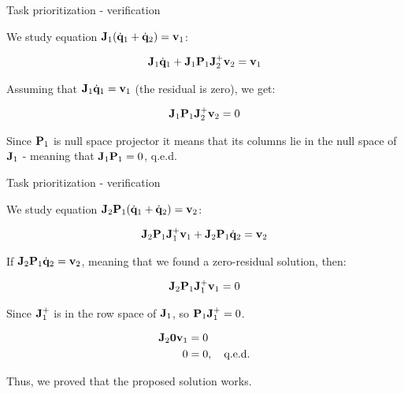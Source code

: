 \documentclass{beamer}
\newcommand{\dq} {\dot{\mathbf{q}}}
\begin{document}
\begin{frame}{Task prioritization - verification}
	\begin{flushleft}
		
	 We study equation $\bo{J}_1 (\dq_1 + \dq_2) =\bo{v}_1$:
	 
	 	\begin{align}
	 		 \bo{J}_1\dq_1 + 
	 		 \bo{J}_1\bo{P}_1 \bo{J}_2^+ \bo{v}_2 =
	 		 \bo{v}_1
	 	\end{align}	
 	
 	Assuming that $\bo{J}_1\dq_1 = \bo{v}_1$ (the residual is zero), we get:
 	
	 	\begin{align}
	\mathbf{J}_1\mathbf{P}_1 \mathbf{J}_2^+ \mathbf{v}_2 = 0
		\end{align}	 	
		
		Since $\mathbf{P}_1$ is null space projector it means that its columns lie in the null space of $\mathbf{J}_1$ - meaning that $\mathbf{J}_1\mathbf{P}_1 = 0$, q.e.d.
		
	\end{flushleft}
\end{frame}


\begin{frame}{Task prioritization - verification}
	\begin{flushleft}
		
		We study equation $\bo{J}_2 \bo{P}_1 (\dq_1 + \dq_2) =\bo{v}_2$:
		
		\begin{align}
			\bo{J}_2 \bo{P}_1 \bo{J}_1^+ \bo{v}_1 + 
			\bo{J}_2 \bo{P}_1 \dq_2 =
			\bo{v}_2
		\end{align}	
	
%		
		
		If $\bo{J}_2 \bo{P}_1  \dq_2 =
		\bo{v}_2$, meaning that we found a zero-residual solution, then:
		
		\begin{align}
			\mathbf{J}_2 \mathbf{P}_1 \mathbf{J}_1^+ \mathbf{v}_1  = 0
		\end{align}	
	
	Since $\mathbf{J}_1^+$ is in the row space of $\mathbf{J}_1$, so $\mathbf{P}_1 \mathbf{J}_1^+ = 0$.
		
		\begin{align}
			\mathbf{J}_2 \mathbf{0} \mathbf{v}_1  &= 0 \\
			0 &= 0, \ \ \ \text{q.e.d.}
		\end{align}	
	
	Thus, we proved that the proposed solution works.
	
	\end{flushleft}
\end{frame}
\end{document}
